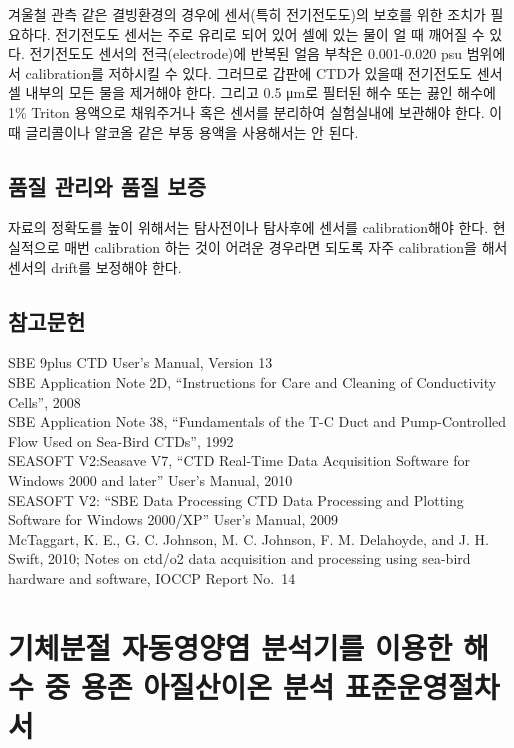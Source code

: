 \documentclass[
]{book}
\begin{document}
겨울철 관측 같은 결빙환경의 경우에 센서(특히 전기전도도)의 보호를 위한 조치가 필요하다. 전기전도도 센서는 주로 유리로 되어 있어 셀에 있는 물이 얼 때 깨어질 수 있다. 전기전도도 센서의 전극(electrode)에 반복된 얼음 부착은 0.001-0.020 psu 범위에서 calibration를 저하시킬 수 있다. 그러므로 갑판에 CTD가 있을때 전기전도도 센서 셀 내부의 모든 물을 제거해야 한다. 그리고 0.5 μm로 필터된 해수 또는 끓인 해수에 1\% Triton 용액으로 채워주거나 혹은 센서를 분리하여 실험실내에 보관해야 한다. 이때 글리콜이나 알코올 같은 부동 용액을 사용해서는 안 된다.

\hypertarget{uxd488uxc9c8-uxad00uxb9acuxc640-uxd488uxc9c8-uxbcf4uxc99d}{%
\section{품질 관리와 품질 보증}\label{uxd488uxc9c8-uxad00uxb9acuxc640-uxd488uxc9c8-uxbcf4uxc99d}}

자료의 정확도를 높이 위해서는 탐사전이나 탐사후에 센서를 calibration해야 한다. 현실적으로 매번 calibration 하는 것이 어려운 경우라면 되도록 자주 calibration을 해서 센서의 drift를 보정해야 한다.

\hypertarget{uxcc38uxace0uxbb38uxd5cc}{%
\section{참고문헌}\label{uxcc38uxace0uxbb38uxd5cc}}

SBE 9plus CTD User's Manual, Version 13\\
SBE Application Note 2D, ``Instructions for Care and Cleaning of Conductivity Cells'', 2008\\
SBE Application Note 38, ``Fundamentals of the T-C Duct and Pump-Controlled Flow Used on Sea-Bird CTDs'', 1992\\
SEASOFT V2:Seasave V7, ``CTD Real-Time Data Acquisition Software for Windows 2000 and later'' User's Manual, 2010\\
SEASOFT V2: ``SBE Data Processing CTD Data Processing and Plotting Software for Windows 2000/XP'' User's Manual, 2009\\
McTaggart, K. E., G. C. Johnson, M. C. Johnson, F. M. Delahoyde, and J. H. Swift, 2010; Notes on ctd/o2 data acquisition and processing using sea-bird hardware and software, IOCCP Report No.~14

\hypertarget{uxae30uxccb4uxbd84uxc808-uxc790uxb3d9uxc601uxc591uxc5fc-uxbd84uxc11duxae30uxb97c-uxc774uxc6a9uxd55c-uxd574uxc218-uxc911-uxc6a9uxc874-uxc544uxc9c8uxc0b0uxc774uxc628-uxbd84uxc11d-uxd45cuxc900uxc6b4uxc601uxc808uxcc28uxc11c}{%
\chapter{기체분절 자동영양염 분석기를 이용한 해수 중 용존 아질산이온 분석 표준운영절차서}\label{uxae30uxccb4uxbd84uxc808-uxc790uxb3d9uxc601uxc591uxc5fc-uxbd84uxc11duxae30uxb97c-uxc774uxc6a9uxd55c-uxd574uxc218-uxc911-uxc6a9uxc874-uxc544uxc9c8uxc0b0uxc774uxc628-uxbd84uxc11d-uxd45cuxc900uxc6b4uxc601uxc808uxcc28uxc11c}}
\end{document}

